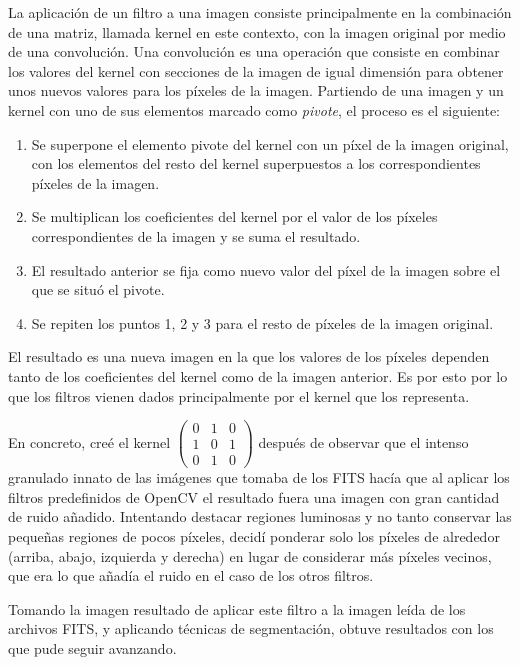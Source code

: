 \documentclass[a4paper,12pt]{article}
\begin{document}
La aplicación de un filtro a una imagen consiste principalmente en la combinación de una matriz, llamada kernel en este contexto, con la imagen original por medio de una convolución. Una convolución es una operación que consiste en combinar los valores del kernel con secciones de la imagen de igual dimensión para obtener unos nuevos valores para los píxeles de la imagen. Partiendo de una imagen y un kernel con uno de sus elementos marcado como \textit{pivote}, el proceso es el siguiente:

\begin{enumerate}
\item Se superpone el elemento pivote del kernel con un píxel de la imagen original, con los elementos del resto del kernel superpuestos a los correspondientes píxeles de la imagen.
\item Se multiplican los coeficientes del kernel por el valor de los píxeles correspondientes de la imagen y se suma el resultado.
\item El resultado anterior se fija como nuevo valor del píxel de la imagen sobre el que se situó el pivote.
\item Se repiten los puntos 1, 2 y 3 para el resto de píxeles de la imagen original.
\end{enumerate}

El resultado es una nueva imagen en la que los valores de los píxeles dependen tanto de los coeficientes del kernel como de la imagen anterior. Es por esto por lo que los filtros vienen dados principalmente por el kernel que los representa.

En concreto, creé el kernel
$\begin{pmatrix}
0 & 1 & 0 \\
1 & 0 & 1 \\
0 & 1 & 0
\end{pmatrix}$
después de observar que el intenso granulado innato de las imágenes que tomaba de los FITS hacía que al aplicar los filtros predefinidos de OpenCV el resultado fuera una imagen con gran cantidad de ruido añadido. Intentando destacar regiones luminosas y no tanto conservar las pequeñas regiones de pocos píxeles, decidí ponderar solo los píxeles de alrededor (arriba, abajo, izquierda y derecha) en lugar de considerar más píxeles vecinos, que era lo que añadía el ruido en el caso de los otros filtros.

Tomando la imagen resultado de aplicar este filtro a la imagen leída de los archivos FITS, y aplicando técnicas de segmentación, obtuve resultados con los que pude seguir avanzando.
\end{document}
